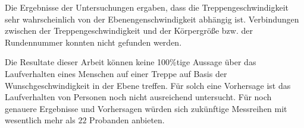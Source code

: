 Die Ergebnisse der Untersuchungen ergaben, dass die Treppengeschwindigkeit sehr wahrscheinlich von der Ebenengenschwindigkeit abhängig ist. Verbindungen zwischen der Treppengeschwindigkeit und der Körpergröße bzw. der Rundennummer konnten nicht gefunden werden.

Die Resultate dieser Arbeit können keine 100\%tige Aussage über das Laufverhalten eines Menschen auf einer Treppe auf Basis der Wunschgeschwindigkeit in der Ebene treffen. Für solch eine Vorhersage ist das Laufverhalten von Personen noch nicht ausreichend untersucht. Für noch genauere Ergebnisse und Vorhersagen würden sich zukünftige Messreihen mit wesentlich mehr als $22$ Probanden anbieten.


